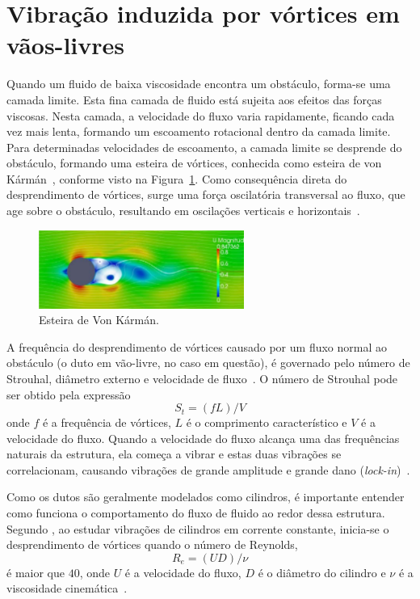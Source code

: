 \section{Vibração induzida por vórtices em vãos-livres}\label{chap:viv}

Quando um fluido de baixa viscosidade encontra um obstáculo, forma-se uma camada limite.
Esta fina camada de fluido está sujeita aos efeitos das forças viscosas.
Nesta camada, a velocidade do fluxo varia rapidamente, ficando cada vez mais lenta, formando um escoamento rotacional dentro da camada limite.
Para determinadas velocidades de escoamento, a camada limite se desprende do obstáculo, formando uma esteira de vórtices, conhecida como esteira de von Kármán~\cite{Currie2002}, conforme visto na Figura~\ref{fig:viv_shading}.
Como consequência direta do desprendimento de vórtices, surge uma força oscilatória transversal ao fluxo, que age sobre o obstáculo, resultando em oscilações verticais e horizontais~\cite{Nielsen2002}.

\begin{figure}[!ht]
    \centering
    \caption{Esteira de Von Kármán.}\label{fig:viv_shading}
    \includegraphics[width=0.6\textwidth]{imagens/viv_shading}
\end{figure}

A frequência do desprendimento de vórtices causado por um fluxo normal ao obstáculo (o duto em vão-livre, no caso em questão), é governado pelo número de Strouhal, diâmetro externo e velocidade de fluxo~\cite{Mork2003}.
O número de Strouhal pode ser obtido pela expressão
\begin{equation}
    S_t = (f L) / V
\end{equation}
onde $f$ é a frequência de vórtices, $L$ é o comprimento característico e $V$ é a velocidade do fluxo.
Quando a velocidade do fluxo alcança uma das frequências naturais da estrutura, ela começa a vibrar e estas duas vibrações se correlacionam, causando vibrações de grande amplitude e grande dano (\textit{lock-in})~\cite{Mork2003}.

Como os dutos são geralmente modelados como cilindros, é importante entender como funciona o comportamento do fluxo de fluido ao redor dessa estrutura. Segundo , ao estudar vibrações de cilindros em corrente constante, inicia-se o desprendimento de vórtices quando o número de Reynolds,
\begin{equation}
    R_e = (U D)/\nu
\end{equation}
é maior que $40$, onde $U$ é a velocidade do fluxo, $D$ é o diâmetro do cilindro e $\nu$ é a viscosidade cinemática~\cite{Sumer1995}.


